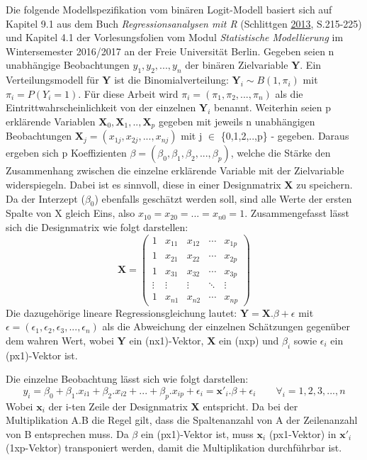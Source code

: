 \documentclass[12pt,]{article}
\begin{document}
Die folgende Modellspezifikation vom binären Logit-Modell basiert sich
auf Kapitel 9.1 aus dem Buch \emph{Regressionsanalysen mit R}
(Schlittgen
\protect\hyperlink{ref-schlittgen2013regressionsanalysen}{2013},
S.215-225) und Kapitel 4.1 der Vorlesungsfolien vom Modul
\emph{Statistische Modellierung} im Wintersemester 2016/2017 an der
Freie Universität Berlin. Gegeben seien n unabhängige Beobachtungen
\(y_1, y_2, ...,y_n\) der binären Zielvariable \(\mathbf{Y}\). Ein
Verteilungsmodell für \(\mathbf{Y}\) ist die Binomialverteilung:
\(\mathbf{Y}_i \sim B(1, \pi_i)\) mit \(\pi_i = P(Y_i = 1)\). Für diese
Arbeit wird \(\pi_i = (\pi_1, \pi_2, ..., \pi_n)\) als die
Eintrittwahrscheinlichkeit von der einzelnen \(\mathbf{Y}_i\) benannt.
Weiterhin seien p erklärende Variablen
\(\mathbf{X}_0,\mathbf{X}_1,..,\mathbf{X}_p\) gegeben mit jeweils n
unabhängigen Beobachtungen
\(\mathbf{X}_j = (x_{1j}, x_{2j},..., x_{nj})\) mit j \(\in\)
\{0,1,2,..,p\} - gegeben. Daraus ergeben sich p Koeffizienten
\(\beta = (\beta_0, \beta_1, \beta_2,..., \beta_p)\), welche die Stärke
den Zusammenhang zwischen die einzelne erklärende Variable mit der
Zielvariable widerspiegeln. Dabei ist es sinnvoll, diese in einer
Designmatrix \(\mathbf{X}\) zu speichern. Da der Interzept (\(\beta_0\))
ebenfalls geschätzt werden soll, sind alle Werte der ersten Spalte von X
gleich Eins, also \(x_{10} = x_{20} = ... = x_{n0} = 1\).
Zusammengefasst lässt sich die Designmatrix wie folgt darstellen: \[
\mathbf{X} =
 \begin{pmatrix}
    1 & x_{11} & x_{12} & \cdots & x_{1p} \\
    1 & x_{21} & x_{22} & \cdots & x_{2p} \\
    1 & x_{31} & x_{32} & \cdots & x_{3p} \\
    \vdots  & \vdots  & \vdots & \ddots & \vdots \\
    1 & x_{n1} & x_{n2} & \cdots & x_{np}
 \end{pmatrix}
\] Die dazugehörige lineare Regressionsgleichung lautet:
\(\mathbf{Y} = \mathbf{X}.\beta + \epsilon\) mit
\(\epsilon = (\epsilon_1, \epsilon_2, \epsilon_3, ..., \epsilon_n)\) als
die Abweichung der einzelnen Schätzungen gegenüber dem wahren Wert,
wobei \(\mathbf{Y}\) ein (nx1)-Vektor, \(\mathbf{X}\) ein (nxp) und
\(\beta_i\) sowie \(\epsilon_i\) ein (px1)-Vektor ist.

Die einzelne Beobachtung lässt sich wie folgt darstellen: \[
y_i = \beta_0 + \beta_1.x_{i1} + \beta_2.x_{i2} + ... + \beta_p.x_{ip} + \epsilon_i = \mathbf{x'}_i.\beta + \epsilon_i \qquad \forall_i = 1,2,3,...,n
\] Wobei \(\mathbf{x}_i\) der i-ten Zeile der Designmatrix
\(\mathbf{X}\) entspricht. Da bei der Multiplikation A.B die Regel gilt,
dass die Spaltenanzahl von A der Zeilenanzahl von B entsprechen muss. Da
\(\beta\) ein (px1)-Vektor ist, muss \(\mathbf{x}_i\) (px1-Vektor) in
\(\mathbf{x'}_i\) (1xp-Vektor) transponiert werden, damit die
Multiplikation durchführbar ist.
\end{document}
